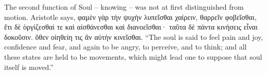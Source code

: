\documentclass[11pt]{article}
\begin{document}
  The second function of Soul -- knowing -- was not at
  first distinguished from motion. Aristotle says, φαμὲν
  γὰρ τὴν ψυχὴν λυπεῖσθαι χαίρειν, θαρρεῖν φοβεῖσθαι, ἔτι
  δὲ ὸργίζεσθαί τε καὶ αἰσθάνεσθαι καὶ διανοεῖσθαι· ταῦτα
  δὲ πάντα κινήσεις εἶναι δοκοῦσιν. ὅθεν οἰηθείη τις ἂν
  αὐτὴν κινεῖσθαι.
  ``The soul is said to feel pain and joy, confidence and
  fear, and again to be angry, to perceive, and to think;
  and all these states are held to be movements, which
  might lead one to suppose that soul itself is moved.''
\end{document}
